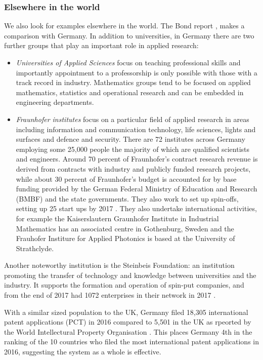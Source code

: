 \documentclass[11pt]{article} %
\begin{document}
	\subsubsection{Elsewhere in the world }	
	
	We also look for examples elsewhere in the world. The Bond report \cite{Bond}, makes a comparison with Germany.   In addition to universities, in Germany there are two further groups that play an important role in applied research:
	\begin{itemize}
		\item \textit{Universities of Applied Sciences} focus on teaching professional skills and importantly appointment to a professorship is only possible with those with a track record in industry. Mathematics groups tend to be focused on applied mathematics, statistics and operational research and can be embedded in engineering departments. 
		\item \textit{Fraunhofer institutes} focus on a particular field of applied research in areas including information and communication technology, life sciences, lights and surfaces and defence and security. There are 72 institutes across Germany employing some 25,000 people the majority of which are qualified scientists and engineers. Around 70 percent of Fraunhofer’s contract research revenue is derived from contracts with industry and publicly funded research projects, while about	30 percent of Fraunhofer’s budget is accounted for by
		base funding provided by the German Federal Ministry of	Education and Research (BMBF) and the state governments. They also work to set up spin-offs, setting up 25 start ups by 2017 \cite{Thum2017}. They also undertake international activities, for example the Kaiserslautern Graunhofer Institute in Industrial Mathematics has an associated centre in Gothenburg, Sweden and the Frauhofer Institure for Applied Photonics is based at the University of Strathclyde. 
	\end{itemize}

	Another noteworthy institution is the Steinbeis Foundation: an institution promoting the transfer of technology and knowledge between universities and the industry. It supports the formation and operation of spin-put companies, and from the end of 2017 had 1072 enterprises in their network in 2017 \cite{Steinbeis}.
	
	With a similar sized population to the UK, Germany filed 18,305 international patent applications (PCT) in 2016 compared to 5,501 in the UK as rpeorted by the World Intellectural Property Organisation \cite{WIPO}. This places Germany 4th in the ranking of the 10 countries who filed the most international patent applications in 2016, suggesting the system as a whole is effective. 
		
\end{document}

